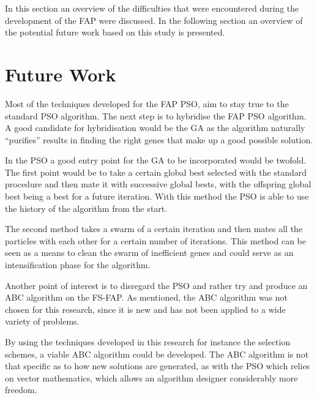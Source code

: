 In this section an overview of the difficulties that were encountered during the development of the FAP were discussed. In the following section an overview of the potential future work based on this study is presented.
\section{Future Work}
\label{sec:futurework}
Most of the techniques developed for the FAP PSO, aim to stay true to the standard PSO algorithm. The next step is to hybridise the FAP PSO algorithm. A good candidate for hybridisation would be the GA as the algorithm naturally ``purifies'' results in finding the right genes that make up a good possible solution.

In the PSO a good entry point for the GA to be incorporated would be twofold. The first point would be to take a certain global best selected with the standard procedure and then mate it with successive global bests, with the offspring global best being a best for a future iteration. With this method the PSO is able to use the history of the algorithm from the start.

The second method takes a swarm of a certain iteration and then mates all the particles with each other for a certain number of iterations. This method can be seen as a means to clean the swarm of inefficient genes and could serve as an intensification phase for the algorithm.

Another point of interest is to disregard the PSO and rather try and produce an ABC algorithm on the FS-FAP. As mentioned, the ABC algorithm was not chosen for this research, since it is new and has not been applied to a wide variety of problems. 

By using the techniques developed in this research for instance the selection schemes, a viable ABC algorithm could be developed. The ABC algorithm is not that specific as to how new solutions are generated, as with the PSO which relies on vector mathematics, which allows an algorithm designer considerably more freedom.





